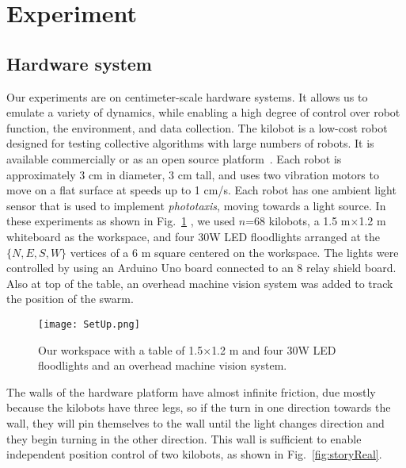 
\section{Experiment}\label{sec:expResults}



\subsection{Hardware system}


Our experiments are on centimeter-scale hardware systems.  It allows us to emulate a variety of dynamics, while enabling a high degree of control over robot function, the environment, and data collection. The kilobot \cite{Rubenstein2012,rubenstein2014programmable} is a low-cost robot designed for testing collective algorithms with large numbers of robots. It is available commercially or as an open source platform~\cite{K-Team2015}.  Each robot is approximately 3 cm in diameter, 3 cm tall, and uses two vibration motors to move on a flat surface at speeds up to 1 cm/s.  Each robot has one ambient light sensor that is used to implement \emph{phototaxis},  moving towards a light source. 
In these experiments as shown in Fig.~\ref{fig:setup} , we used $n$=68 kilobots, a 1.5 m$\times$1.2 m whiteboard as the workspace, and four 30W LED floodlights arranged at the $\{N,E,S,W\}$ vertices of a 6 m square centered on the workspace. The lights were controlled by using an Arduino Uno board connected to an 8 relay shield board. Also at top of the table, an overhead machine vision system was added to track the position of the swarm.

\begin{figure}
\begin{center}
	\texttt{[image: SetUp.png]}
\end{center}
\caption{\label{fig:setup}
Our workspace with a table of 1.5$\times$1.2 m and four 30W LED floodlights and an overhead machine vision system.
}
\end{figure}

The walls of the hardware platform have almost infinite friction, due mostly because the kilobots have three legs, so if the turn in one direction towards the wall, they will pin themselves to the wall until the light changes direction and they begin turning in the other direction.  This wall is sufficient to enable independent position control of two kilobots, as shown in Fig.~\ref{fig:storyReal}.



